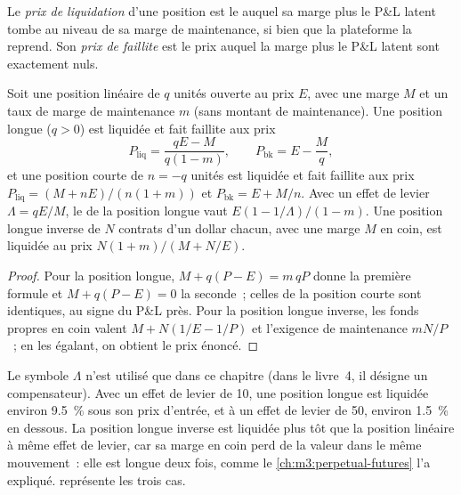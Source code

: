 \begin{definition}\label{def:m3:margin-liquidation-and-loss-allocation:prices}
Le \emph{prix de liquidation} d'une position est le  auquel sa marge plus le
P\&L latent tombe au niveau de sa marge de maintenance, si bien que la plateforme la reprend. Son \emph{prix de
faillite} est le prix auquel la marge plus le P\&L latent sont exactement nuls.
\end{definition}

\begin{proposition}\label{prop:m3:margin-liquidation-and-loss-allocation:liq}
Soit une position linéaire de $q$ unités ouverte au prix $E$, avec une marge $M$ et un taux de marge de maintenance $m$ (sans
montant de maintenance). Une position longue ($q > 0$) est liquidée et fait faillite aux prix
\[
P_{\mathrm{liq}} = \frac{qE - M}{q(1 - m)}, \qquad P_{\mathrm{bk}} = E - \frac{M}{q},
\]
et une position courte de $n = -q$ unités est liquidée et fait faillite aux prix $P_{\mathrm{liq}} = (M + nE)/(n(1 + m))$ et $P_{\mathrm{bk}} = E + M/n$. Avec
un effet de levier $\Lambda = qE/M$, le  de la position longue vaut $E(1 - 1/\Lambda)/(1 - m)$. Une position longue inverse de
$N$ contrats d'un dollar chacun, avec une marge $M$ en coin, est liquidée au prix $N(1 + m)/(M + N/E)$.
\end{proposition}

\begin{proof}
Pour la position longue, $M + q(P - E) = m\,qP$ donne la première formule et $M + q(P - E) = 0$ la seconde~; celles de la position courte
sont identiques, au signe du P\&L près. Pour la position longue inverse, les fonds propres en coin valent $M + N(1/E - 1/P)$ et
l'exigence de maintenance $mN/P$~; en les égalant, on obtient le prix énoncé.
\end{proof}

Le symbole $\Lambda$ n'est utilisé que dans ce chapitre (dans le livre~4, il désigne un compensateur). Avec un effet de levier de 10, une
position longue est liquidée environ 9.5~\% sous son prix d'entrée, et à un effet de levier de 50, environ 1.5~\% en dessous. La position longue inverse est liquidée plus tôt
que la position linéaire à même effet de levier, car sa marge en coin perd de la valeur dans le même mouvement~: elle est longue deux fois, comme
le \cref{ch:m3:perpetual-futures} l'a expliqué.  représente les trois cas.

